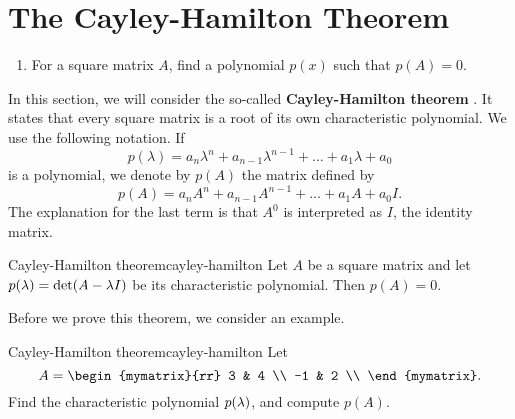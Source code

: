 \section{The Cayley-Hamilton Theorem}

\begin{outcome}
  \begin{enumerate}
  \item For a square matrix $A$, find a polynomial $p(x)$ such that $p(A)=0$.
  \end{enumerate}
\end{outcome}

In this section, we will consider the so-called
\textbf{Cayley-Hamilton theorem}%
%
%
. It states that every square
matrix is a root of its own characteristic polynomial. We use the
following notation. If
\begin{equation*}
  p(\lambda) = a_n\lambda^n + a_{n-1}\lambda^{n-1} + \ldots +
  a_1\lambda + a_0
\end{equation*}
is a polynomial, we denote by $p(A)$ the matrix defined by
\begin{equation*}
  p(A) = a_nA^n + a_{n-1}A^{n-1} + \ldots + a_1A + a_0I.
\end{equation*}
The explanation for the last term is that $A^0$ is interpreted as $I$,
the identity matrix.

\begin{theorem}{Cayley-Hamilton theorem}{cayley-hamilton}
  Let $A$ be a square matrix and let $p(\lambda)=\det(A-\lambda
  I)$ be its characteristic polynomial. Then $p(A)=0$.
\end{theorem}

Before we prove this theorem, we consider an example.

\begin{example}{Cayley-Hamilton theorem}{cayley-hamilton}
  Let
  \begin{equation*}
    A = \begin{mymatrix}{rr}
      3 & 4 \\
      -1 & 2 \\
    \end{mymatrix}.
  \end{equation*}
  Find the characteristic polynomial $p(\lambda)$, and compute
  $p(A)$.
\end{example}

